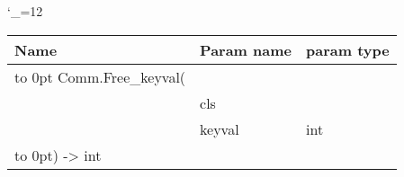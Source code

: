 \begingroup \catcode`\_=12 \tt
\begin{tabular}{lll}
\toprule
\textrm{Name}&\textrm{Param name}&\textrm{param type}\\
\midrule
\hbox to 0pt {Comm.Free_keyval(\hss}\\
& cls\\
& keyval & int\\
\hbox to 0pt{) -> int\hss}\\
\bottomrule
\end{tabular}
\endgroup
